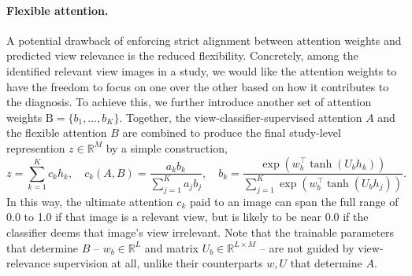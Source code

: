 \paragraph{Flexible attention.}
A potential drawback of enforcing strict alignment between attention weights and predicted view relevance is the reduced 
flexibility. Concretely, among the identified relevant view images in a study, we would like the attention weights to have the freedom to focus on one over the other based on how it contributes to the diagnosis. To achieve this, we further introduce another set of attention weights $\mathrm{B} = \{b_1, \dots, b_K\}$.
Together, the view-classifier-supervised attention $A$ and the flexible attention $B$ are combined to produce the final study-level represention $z \in \mathbb{R}^{M}$ by a simple construction,
\begin{equation}
\label{eq:patient_embedding_samil}
    z = \sum_{k=1}^K c_k h_k, \quad c_k(A,B) = \frac{a_k b_k}{\sum_{j=1}^K a_j b_j }, 
    \quad b_k = \frac{\exp(w_{b}^\top \tanh(U_b h_k))}{\sum_{j=1}^K \exp(w_{b}^\top \tanh(U_b h_j))}.
\end{equation}
In this way, the ultimate attention $c_k$ paid to an image can span the full range of 0.0 to 1.0 if that image is a relevant view, but is likely to be near 0.0 if the classifier deems that image's view irrelevant.
Note that the trainable parameters that determine $B$ -- $w_b \in \mathbb{R}^{L}$ and matrix $U_b \in \mathbb{R}^{L \times M}$ -- are not guided by view-relevance supervision at all, unlike their counterparts $w, U$ that determine $A$.





